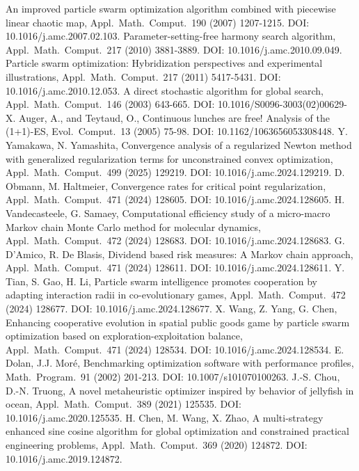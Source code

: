 \documentclass[review]{elsarticle}
\theoremstyle{definition}
\begin{document}
\begin{enumerate}
 An improved particle swarm optimization algorithm combined with piecewise linear chaotic map, Appl.\ Math.\ Comput.\ 190 (2007) 1207-1215. DOI: 10.1016/j.amc.2007.02.103.
 Parameter-setting-free harmony search algorithm, Appl.\ Math.\ Comput.\ 217 (2010) 3881-3889. DOI: 10.1016/j.amc.2010.09.049.
 Particle swarm optimization: Hybridization perspectives and experimental illustrations, Appl.\ Math.\ Comput.\ 217 (2011) 5417-5431. DOI: 10.1016/j.amc.2010.12.053.
 A direct stochastic algorithm for global search, Appl.\ Math.\ Comput.\ 146 (2003) 643-665. DOI: 10.1016/S0096-3003(02)00629-X.
 Auger, A., and Teytaud, O., Continuous lunches are free! Analysis of the (1+1)-ES, Evol.\ Comput.\ 13 (2005) 75-98. DOI: 10.1162/1063656053308448.
 Y. Yamakawa, N. Yamashita, Convergence analysis of a regularized Newton method with generalized regularization terms for unconstrained convex optimization, Appl.\ Math.\ Comput.\ 499 (2025) 129219. DOI: 10.1016/j.amc.2024.129219.
 D. Obmann, M. Haltmeier, Convergence rates for critical point regularization, Appl.\ Math.\ Comput.\ 471 (2024) 128605. DOI: 10.1016/j.amc.2024.128605.
 H. Vandecasteele, G. Samaey, Computational efficiency study of a micro-macro Markov chain Monte Carlo method for molecular dynamics, Appl.\ Math.\ Comput.\ 472 (2024) 128683. DOI: 10.1016/j.amc.2024.128683.
 G. D'Amico, R. De Blasis, Dividend based risk measures: A Markov chain approach, Appl.\ Math.\ Comput.\ 471 (2024) 128611. DOI: 10.1016/j.amc.2024.128611.
 Y. Tian, S. Gao, H. Li, Particle swarm intelligence promotes cooperation by adapting interaction radii in co-evolutionary games, Appl.\ Math.\ Comput.\ 472 (2024) 128677. DOI: 10.1016/j.amc.2024.128677.
 X. Wang, Z. Yang, G. Chen, Enhancing cooperative evolution in spatial public goods game by particle swarm optimization based on exploration-exploitation balance, Appl.\ Math.\ Comput.\ 471 (2024) 128534. DOI: 10.1016/j.amc.2024.128534.
 E. Dolan, J.J. Mor\'e, Benchmarking optimization software with performance profiles, Math.\ Program.\ 91 (2002) 201-213. DOI: 10.1007/s101070100263.
 J.-S. Chou, D.-N. Truong, A novel metaheuristic optimizer inspired by behavior of jellyfish in ocean, Appl.\ Math.\ Comput.\ 389 (2021) 125535. DOI: 10.1016/j.amc.2020.125535.
 H. Chen, M. Wang, X. Zhao, A multi-strategy enhanced sine cosine algorithm for global optimization and constrained practical engineering problems, Appl.\ Math.\ Comput.\ 369 (2020) 124872. DOI: 10.1016/j.amc.2019.124872.

\end{enumerate}
\end{document}
